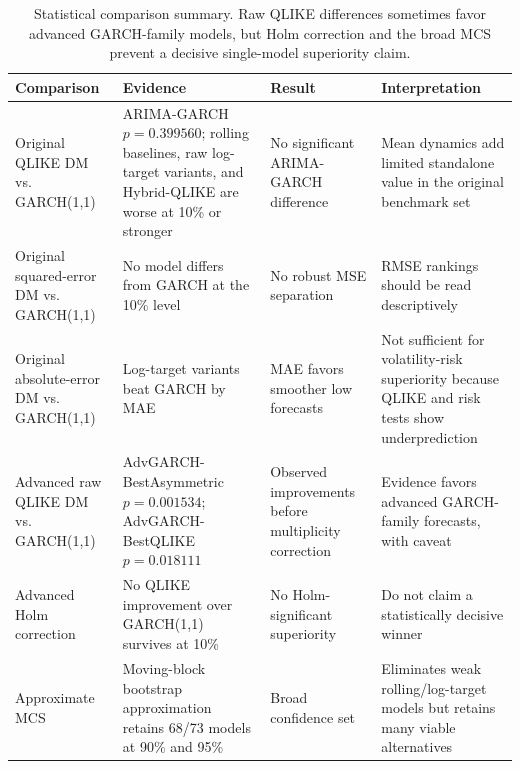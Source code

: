 \begin{table}[!t]
\centering
\caption{Statistical comparison summary. Raw QLIKE differences sometimes favor advanced GARCH-family models, but Holm correction and the broad MCS prevent a decisive single-model superiority claim.}
\label{tab:stat-tests}
\scriptsize
\setlength{\tabcolsep}{4pt}
\begin{tabular}{@{}L{0.24\textwidth}L{0.25\textwidth}L{0.17\textwidth}L{0.24\textwidth}@{}}
\toprule
Comparison & Evidence & Result & Interpretation \\
\midrule
Original QLIKE DM vs. GARCH(1,1) & ARIMA-GARCH \(p=0.399560\); rolling baselines, raw log-target variants, and Hybrid-QLIKE are worse at 10\% or stronger & No significant ARIMA-GARCH difference & Mean dynamics add limited standalone value in the original benchmark set \\
Original squared-error DM vs. GARCH(1,1) & No model differs from GARCH at the 10\% level & No robust MSE separation & RMSE rankings should be read descriptively \\
Original absolute-error DM vs. GARCH(1,1) & Log-target variants beat GARCH by MAE & MAE favors smoother low forecasts & Not sufficient for volatility-risk superiority because QLIKE and risk tests show underprediction \\
Advanced raw QLIKE DM vs. GARCH(1,1) & AdvGARCH-BestAsymmetric \(p=0.001534\); AdvGARCH-BestQLIKE \(p=0.018111\) & Observed improvements before multiplicity correction & Evidence favors advanced GARCH-family forecasts, with caveat \\
Advanced Holm correction & No QLIKE improvement over GARCH(1,1) survives at 10\% & No Holm-significant superiority & Do not claim a statistically decisive winner \\
Approximate MCS & Moving-block bootstrap approximation retains 68/73 models at 90\% and 95\% & Broad confidence set & Eliminates weak rolling/log-target models but retains many viable alternatives \\
\bottomrule
\end{tabular}
\end{table}
